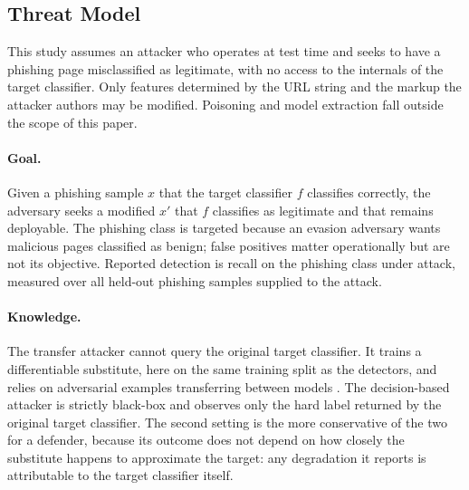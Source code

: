\documentclass[runningheads]{llncs}
\begin{document}
\subsection{Threat Model}
\label{sec:method-threat}

This study assumes an attacker who operates at test time and seeks to have a
phishing page misclassified as legitimate, with no access to the internals of
the target classifier. Only features determined by the URL string
and the markup the attacker authors may be modified. Poisoning and model
extraction fall outside the scope of this paper.

\paragraph{Goal.} Given a phishing sample $x$ that the target classifier $f$ classifies correctly,
the adversary seeks a modified $x'$ that $f$ classifies as legitimate and that
remains deployable. The phishing class is targeted because an evasion adversary
wants malicious pages classified as benign; false positives matter
operationally but are not its objective.
Reported detection is recall on the phishing class under attack, measured over
all held-out phishing samples supplied to the attack.

\paragraph{Knowledge.} The transfer attacker cannot query the original target
classifier. It trains a differentiable substitute, here on the same training split as
the detectors, and relies
on adversarial examples transferring between models \cite{papernot2017}. The
decision-based attacker is strictly black-box and observes only the hard label
returned by the original target classifier. The second setting is the more
conservative of the two for a defender, because its outcome does not depend on
how closely the substitute happens to approximate the target: any degradation it reports is attributable to
the target classifier itself.
\end{document}
